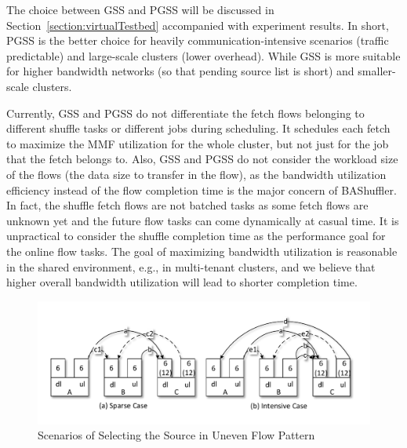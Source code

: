 \documentclass[10pt,journal,compsoc]{IEEEtran}
\begin{document}
The choice between GSS and PGSS will be discussed in Section~\ref{section:virtualTestbed} accompanied with experiment results. 
In short, PGSS is the better choice for heavily communication-intensive scenarios (traffic predictable) and large-scale clusters (lower overhead). 
While GSS is more suitable for higher bandwidth networks (so that pending source list is short) and smaller-scale clusters.

Currently, GSS and PGSS do not differentiate the fetch flows belonging to different shuffle tasks or different jobs during scheduling. 
It schedules each fetch to maximize the MMF utilization for the whole cluster, but not just for the job that the fetch belongs to. 
Also, GSS and PGSS do not consider the workload size of the flows (the data size to transfer in the flow), as the bandwidth utilization efficiency instead of the flow completion time is the major concern of BAShuffler. 
In fact, the shuffle fetch flows are not batched tasks as some fetch flows are unknown yet and the future flow tasks can come dynamically at casual time.
It is unpractical to consider the shuffle completion time as the performance goal for the online flow tasks.
The goal of maximizing bandwidth utilization is reasonable in the shared environment, e.g., in multi-tenant clusters, and we believe that higher overall bandwidth utilization will lead to shorter completion time.



\begin{figure}[!t]
\centering

\includegraphics[width=1\columnwidth]{figure3}

\caption{Scenarios of Selecting the Source in Uneven Flow Pattern}
\label{fig:network}
\end{figure}
\end{document}
